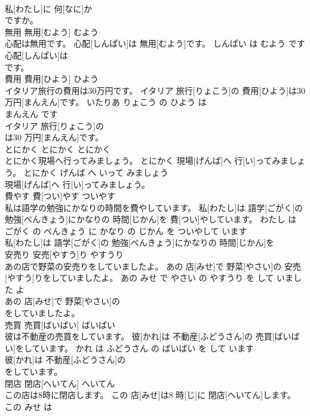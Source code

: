 \documentclass[8pt]{extreport}
\begin{document}
\begin{CJK}{UTF8}{min}
\\	私[わたし]に 何[なに]か
\\	ですか。			
\\	無用	無用[むよう]	むよう	
\\	心配は無用です。	心配[しんぱい]は 無用[むよう]です。	しんぱい は むよう です	
\\	心配[しんぱい]は
\\	です。			
\\	費用	費用[ひよう]	ひよう	
\\	イタリア旅行の費用は30万円です。	イタリア 旅行[りょこう]の 費用[ひよう]は30 万円[まんえん]です。	いたりあ りょこう の ひよう は 
\\	まんえん です	
\\	イタリア 旅行[りょこう]の
\\	は30 万円[まんえん]です。			
\\	とにかく	とにかく	とにかく	
\\	とにかく現場へ行ってみましょう。	とにかく 現場[げんば]へ 行[い]ってみましょう。	とにかく げんば へ いって みましょう	
\\	現場[げんば]へ 行[い]ってみましょう。			
\\	費やす	費[つい]やす	ついやす	
\\	私は語学の勉強にかなりの時間を費やしています。	私[わたし]は 語学[ごがく]の 勉強[べんきょう]にかなりの 時間[じかん]を 費[つい]やしています。	わたし は ごがく の べんきょう に かなり の じかん を ついやして います	
\\	私[わたし]は 語学[ごがく]の 勉強[べんきょう]にかなりの 時間[じかん]を
\\	安売り	安売[やすう]り	やすうり	
\\	あの店で野菜の安売りをしていましたよ。	あの 店[みせ]で 野菜[やさい]の 安売[やすう]りをしていましたよ。	あの みせ で やさい の やすうり を して いました よ	
\\	あの 店[みせ]で 野菜[やさい]の
\\	をしていましたよ。			
\\	売買	売買[ばいばい]	ばいばい	
\\	彼は不動産の売買をしています。	彼[かれ]は 不動産[ふどうさん]の 売買[ばいばい]をしています。	かれ は ふどうさん の ばいばい を して います	
\\	彼[かれ]は 不動産[ふどうさん]の
\\	をしています。			
\\	閉店	閉店[へいてん]	へいてん	
\\	この店は8時に閉店します。	この 店[みせ]は8 時[じ]に 閉店[へいてん]します。	この みせ は 

\end{CJK}
\end{document}
